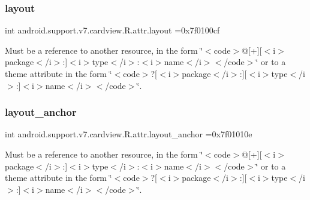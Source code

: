 \subsubsection{\texorpdfstring{layout}{layout}}
{\footnotesize\ttfamily int android.\+support.\+v7.\+cardview.\+R.\+attr.\+layout =0x7f0100cf\hspace{0.3cm}{\ttfamily [static]}}

Must be a reference to another resource, in the form \char`\"{}$<$code$>$@\mbox{[}+\mbox{]}\mbox{[}$<$i$>$package$<$/i$>$\+:\mbox{]}$<$i$>$type$<$/i$>$\+:$<$i$>$name$<$/i$>$$<$/code$>$\char`\"{} or to a theme attribute in the form \char`\"{}$<$code$>$?\mbox{[}$<$i$>$package$<$/i$>$\+:\mbox{]}\mbox{[}$<$i$>$type$<$/i$>$\+:\mbox{]}$<$i$>$name$<$/i$>$$<$/code$>$\char`\"{}. \mbox{\label{classandroid_1_1support_1_1v7_1_1cardview_1_1R_1_1attr_afc4b9010c3937b0764107dd38f877e13}} 
\subsubsection{\texorpdfstring{layout\+\_\+anchor}{layout\_anchor}}
{\footnotesize\ttfamily int android.\+support.\+v7.\+cardview.\+R.\+attr.\+layout\+\_\+anchor =0x7f01010e\hspace{0.3cm}{\ttfamily [static]}}

Must be a reference to another resource, in the form \char`\"{}$<$code$>$@\mbox{[}+\mbox{]}\mbox{[}$<$i$>$package$<$/i$>$\+:\mbox{]}$<$i$>$type$<$/i$>$\+:$<$i$>$name$<$/i$>$$<$/code$>$\char`\"{} or to a theme attribute in the form \char`\"{}$<$code$>$?\mbox{[}$<$i$>$package$<$/i$>$\+:\mbox{]}\mbox{[}$<$i$>$type$<$/i$>$\+:\mbox{]}$<$i$>$name$<$/i$>$$<$/code$>$\char`\"{}. \mbox{\label{classandroid_1_1support_1_1v7_1_1cardview_1_1R_1_1attr_a25058deb29377972d2da6be407edfddc}} 

